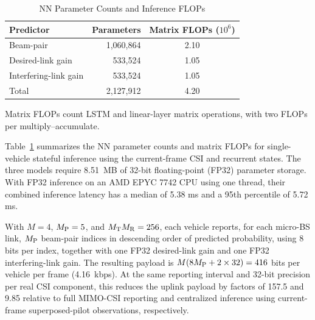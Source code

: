 \documentclass[conference, a4paper]{IEEEtran}
\newcommand{\rev}[1]{\textcolor{revisioncolor}{{}#1}}
\theoremstyle{remark}
\begin{document}
\begin{table}[tbp]
    \centering
    \color{revisioncolor}
    \caption{NN Parameter Counts and Inference FLOPs}
    \label{tab:nn-overhead}
    \small
    \begin{tabular}{lrc}
        \toprule
        Predictor & Parameters & {Matrix FLOPs ($10^6$)} \\
        \midrule
        Beam-pair & 1,060,864 & 2.10 \\
        Desired-link gain & 533,524 & 1.05 \\
        Interfering-link gain & 533,524 & 1.05 \\
        Total & 2,127,912 & 4.20 \\
        \bottomrule
    \end{tabular}
    \par\smallskip
    \parbox{\columnwidth}{\footnotesize Matrix FLOPs count LSTM and linear-layer matrix operations, with two FLOPs per multiply--accumulate.}
\end{table}

\rev{Table~\ref{tab:nn-overhead} summarizes the NN parameter counts and matrix FLOPs for single-vehicle stateful inference using the current-frame CSI and recurrent states. The three models require 8.51~MB of 32-bit floating-point (FP32) parameter storage. With FP32 inference on an AMD EPYC 
7742 CPU using one thread, their combined inference latency has a median of \rev{5.38} ms and a 95th percentile of \rev{5.72} ms.}

\rev{With $M=4$, $M_{\rm P}=5$, and $M_{\rm T}M_{\rm R}=256$, each vehicle reports, for each micro-BS link, $M_{\rm P}$ beam-pair indices in descending order of predicted probability, using 8 bits per index, together with one FP32 desired-link gain and one FP32 interfering-link gain. The resulting payload is $M(8M_{\rm P}+2\times32)=416$ bits per vehicle per frame (4.16~kbps). At the same reporting interval and 32-bit precision per real CSI component, this reduces the uplink payload by factors of 157.5 and 9.85 relative to full MIMO-CSI reporting and centralized inference using current-frame superposed-pilot observations, respectively.}

\end{document}
